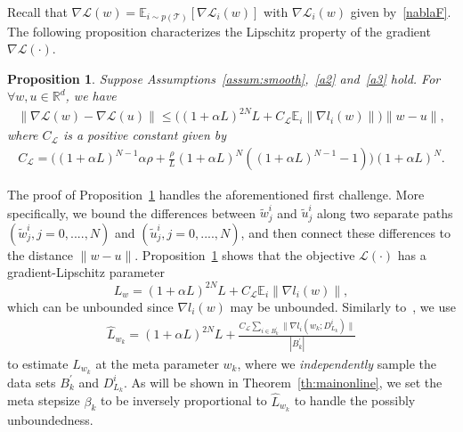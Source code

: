 \documentclass{osudissert96}
\newtheorem{proposition}{Proposition}
\begin{document}
Recall that  $\nabla \mathcal{L}(w) = \mathbb{E}_{i\sim p(\mathcal{T})} [\nabla \mathcal{L}_i(w)]$ with  $\nabla \mathcal{L}_i(w)$ given by~\cref{nablaF}. The following proposition characterizes the Lipschitz property of the gradient $\nabla \mathcal{L}(\cdot)$. 
\begin{proposition}\label{th:lipshiz}
	 Suppose   Assumptions~\ref{assum:smooth},~\ref{a2} and~\ref{a3} hold. For $\forall w,u\in\mathbb{R}^d$, we have 
	\begin{align*}
	\|\nabla \mathcal{L}(w) - \nabla \mathcal{L}(u)\|  \leq \big( (1+\alpha L) ^{2N}L + C_\mathcal{L} \mathbb{E}_{i}\|\nabla l_i(w)\|\big) \|w-u\|,
	\end{align*}
	where $C_\mathcal{L}$ is a positive constant  given by{
	\begin{align}\label{clcl}
	C_\mathcal{L}= \big(  (1+\alpha L) ^{N-1}\alpha \rho + \frac{\rho}{L}  (1+\alpha L) ^N ( (1+\alpha L) ^{N-1} -1) \big)  (1+\alpha L) ^N.
	\end{align}}
\end{proposition}   
The proof of Proposition~\ref{th:lipshiz} handles the aforementioned first challenge. More specifically,  
we bound the differences between $\widetilde w_j^i$ and $\widetilde u_j^i$ along two separate paths $(\widetilde w_j^i, j =0,....,N)$ and $(\widetilde u_j^i, j =0,....,N )$, and then connect these differences to the distance $\|w-u\|$. Proposition~\ref{th:lipshiz} shows that the objective $\mathcal{L}(\cdot)$ has a gradient-Lipschitz parameter $$L_w =  (1+\alpha L) ^{2N}L + C_\mathcal{L}\mathbb{E}_{i}\|\nabla l_i(w)\|,$$ 
which can  be unbounded since  $\nabla l_i(w)$ may be unbounded. 
Similarly to~\cite{fallah2020convergence}, we  use 
\begin{align}\label{hatlw}
\widehat L_{w_k} =   (1+\alpha L) ^{2N}L + \frac{ C_\mathcal{L}\sum_{i\in B_k^\prime}\|\nabla l_i(w_k; D_{L_k}^i)\|}{|B_k^\prime|}
\end{align}
to estimate $L_{w_k}$ at the meta parameter $w_k$, where we  {\em independently} sample the data sets $B_k^\prime$ and $D_{L_k}^i$. As will be shown in Theorem~\ref{th:mainonline}, we  set the meta stepsize $\beta_k$ to be inversely proportional to { $\widehat L_{w_k} $} to handle the  possibly unboundedness. 
\end{document}
